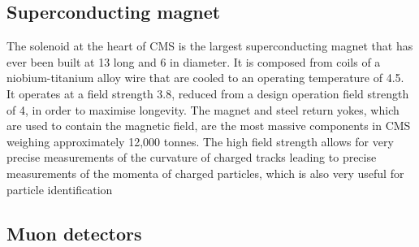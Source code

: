 \subsection{Superconducting magnet}
\label{ssec:Magnet}

The solenoid at the heart of CMS is the largest superconducting magnet that has ever been built at 13\m{} long and 6\m{} in diameter.
It is composed from coils of a niobium-titanium alloy wire that are cooled to an operating temperature of 4.5\Kelvin{}. 
It operates at a field strength 3.8\Tesla{}, reduced from a design operation field strength of 4\Tesla{}, in order to maximise longevity.
The magnet and steel return yokes, which are used to contain the magnetic field, are the most massive components in CMS weighing approximately 12,000 tonnes.
The high field strength allows for very precise measurements of the curvature of charged tracks leading to precise measurements of the momenta of charged particles, which is also very useful for particle identification 

\subsection{Muon detectors}
\label{ssec:MuonChambers}

